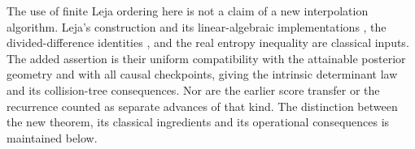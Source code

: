 The use of finite Leja ordering here is not a claim of a new interpolation
algorithm. Leja's construction and its linear-algebraic implementations
\cite{Leja,BosEtAl}, the divided-difference identities \cite{deBoor}, and
the real entropy inequality \cite{YomdinComte,ComteHalupczok} are classical
inputs. The added assertion is their uniform compatibility with the
attainable posterior geometry and with all causal checkpoints, giving the
intrinsic determinant law and its collision-tree consequences. Nor are
the earlier score transfer or the recurrence counted as separate advances
of that kind. The distinction between the new theorem, its classical
ingredients and its operational consequences is maintained below.
